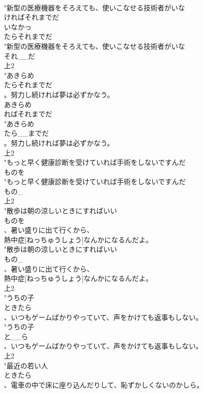 \documentclass[8pt]{extreport}
\begin{document}
\begin{CJK}{UTF8}{min}
\\	"新型の医療機器をそろえても、使いこなせる技術者がいな
\\	ければそれまでだ
\\	いなかっ
\\	たらそれまでだ
\\	"新型の医療機器をそろえても、使いこなせる技術者がいな
\\	それ__だ
\\	上2
\\	"あきらめ
\\	たらそれまでだ
\\	。努力し続ければ夢は必ずかなう。
\\	あきらめ
\\	ればそれまでだ
\\	"あきらめ
\\	たら__までだ
\\	。努力し続ければ夢は必ずかなう。
\\	上2
\\	"もっと早く健康診断を受けていれば手術をしないですんだ
\\	ものを
\\	"もっと早く健康診断を受けていれば手術をしないですんだ
\\	もの_
\\	上2
\\	"散歩は朝の涼しいときにすればいい
\\	ものを
\\	、暑い盛りに出て行くから、
\\	熱中症[ねっちゅうしょう]なんかになるんだよ。
\\	"散歩は朝の涼しいときにすればいい
\\	もの_
\\	、暑い盛りに出て行くから、
\\	熱中症[ねっちゅうしょう]なんかになるんだよ。
\\	上2
\\	"うちの子
\\	ときたら
\\	、いつもゲームばかりやっていて、声をかけても返事もしない。
\\	"うちの子
\\	と__ら
\\	、いつもゲームばかりやっていて、声をかけても返事もしない。
\\	上2
\\	"最近の若い人
\\	ときたら
\\	、電車の中で床に座り込んだりして、恥ずかしくないのかしら。

\end{CJK}
\end{document}
